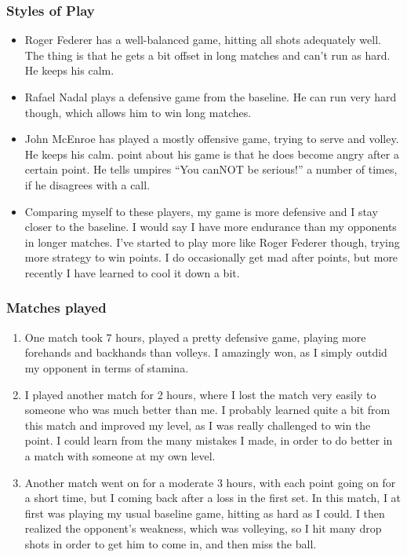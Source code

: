 \begin{frame} 
\frametitle{ Styles of Play }
\begin{itemize} 
\item \small Roger Federer has a well-balanced game, hitting all
  shots adequately well. The thing is that he gets a bit offset in
  long matches and can't run as hard.  He keeps his calm. 

\item \small Rafael Nadal plays a defensive game from the baseline. He
  can run very hard though, which allows him to win long matches. 
\item \small John McEnroe has played a mostly offensive game, trying
  to serve and volley. He keeps his calm. 
  point about his game is that he does become angry after a certain
  point. He tells umpires ``You canNOT be serious!'' a number of
  times, if he disagrees with a call.  
\item \small Comparing myself to these players, my game is more
  defensive and I stay closer to the baseline. I would say I have more
  endurance than my opponents in longer matches.  I've started to play
  more like Roger Federer though, trying more strategy to win points. 
  I do occasionally get mad after points,  but more recently I have learned to cool it down a bit. 
\end{itemize} 
\end{frame} 

\begin{frame}
\frametitle{Matches played} 
\begin{enumerate}
\item \small One match took 7 hours,  played a pretty defensive game, playing
  more forehands and backhands than volleys. I amazingly won, as I simply
  outdid my opponent in terms of stamina. 
\item \small I played another match for 2 hours, 
  where I lost the match very easily to someone who was much better
  than me. I probably learned quite a bit from this match and improved
  my level, as I was really challenged to win the point. I could learn
  from the many mistakes I made, in order to do better in a match with
 someone at my own level. 
\item \small Another match went on for a moderate 3 hours, with each
  point going on for a short time, but I coming back after a loss in
  the first set. In this match, I at first was playing my usual
  baseline game, hitting as hard as I could. 
  I then realized the opponent's weakness, which was volleying, 
so I hit many drop shots in order to get him to come in, and then miss
the ball. 
\end{enumerate} 
\end{frame}

